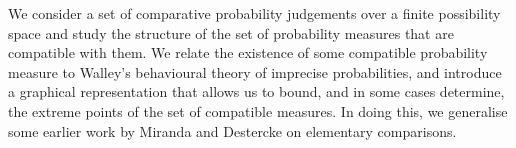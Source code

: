 
We consider a set of comparative probability judgements over a finite possibility space and study the structure of the set of probability measures that are compatible with them.
We relate the existence of some compatible probability measure to Walley's behavioural theory of imprecise probabilities, and introduce a graphical representation that allows us to bound, and in some cases determine, the extreme points of the set of compatible measures.
In doing this, we generalise some earlier work by Miranda and Destercke on elementary comparisons.


